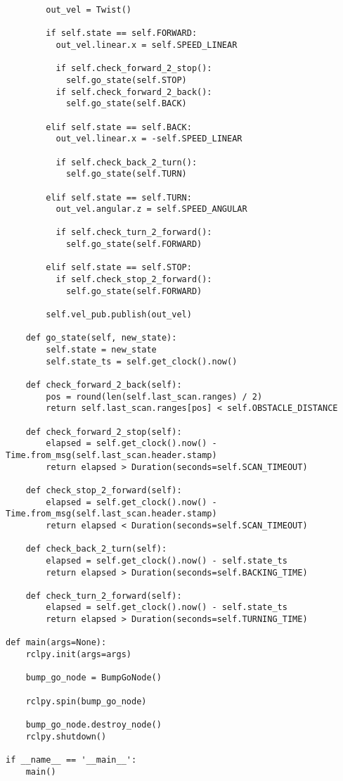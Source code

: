 \begin{tcolorbox}[sharp corners, colframe=gray!80, colback=LightGray, left=0pt, top=0pt, bottom=0pt, title=\texttt{br2\_fsm\_bumpgo\_py/br2\_fsm\_bumpgo\_py/bump\_go\_main.py}]
\begin{verbatim}
        out_vel = Twist()

        if self.state == self.FORWARD:
          out_vel.linear.x = self.SPEED_LINEAR

          if self.check_forward_2_stop():
            self.go_state(self.STOP)
          if self.check_forward_2_back():
            self.go_state(self.BACK)

        elif self.state == self.BACK:
          out_vel.linear.x = -self.SPEED_LINEAR

          if self.check_back_2_turn():
            self.go_state(self.TURN)

        elif self.state == self.TURN:
          out_vel.angular.z = self.SPEED_ANGULAR

          if self.check_turn_2_forward():
            self.go_state(self.FORWARD)

        elif self.state == self.STOP:
          if self.check_stop_2_forward():
            self.go_state(self.FORWARD)

        self.vel_pub.publish(out_vel)

    def go_state(self, new_state):
        self.state = new_state
        self.state_ts = self.get_clock().now()

    def check_forward_2_back(self):
        pos = round(len(self.last_scan.ranges) / 2)
        return self.last_scan.ranges[pos] < self.OBSTACLE_DISTANCE

    def check_forward_2_stop(self):
        elapsed = self.get_clock().now() - Time.from_msg(self.last_scan.header.stamp)
        return elapsed > Duration(seconds=self.SCAN_TIMEOUT)

    def check_stop_2_forward(self):
        elapsed = self.get_clock().now() - Time.from_msg(self.last_scan.header.stamp)
        return elapsed < Duration(seconds=self.SCAN_TIMEOUT)

    def check_back_2_turn(self):
        elapsed = self.get_clock().now() - self.state_ts
        return elapsed > Duration(seconds=self.BACKING_TIME)

    def check_turn_2_forward(self):
        elapsed = self.get_clock().now() - self.state_ts
        return elapsed > Duration(seconds=self.TURNING_TIME)

def main(args=None):
    rclpy.init(args=args)

    bump_go_node = BumpGoNode()

    rclpy.spin(bump_go_node)

    bump_go_node.destroy_node()
    rclpy.shutdown()

if __name__ == '__main__':
    main()
    \end{verbatim}
    \end{tcolorbox}
  \normalsize

